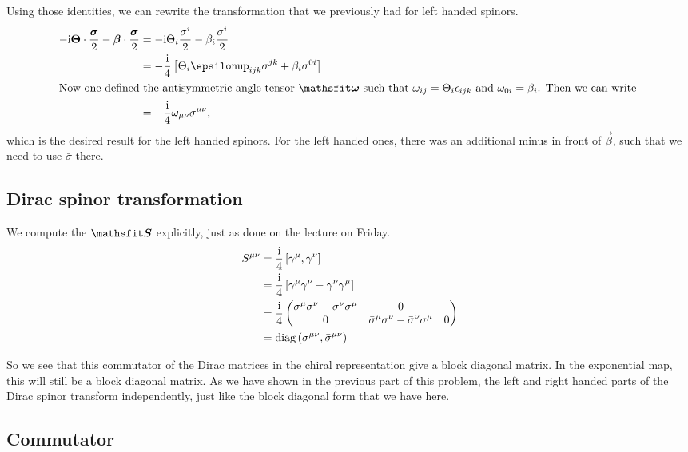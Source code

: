 \documentclass[11pt, english, fleqn, DIV=15, headinclude, BCOR=1cm]{scrartcl}
\begin{document}
Using those identities, we can rewrite the transformation that we previously
had for left handed spinors.
\begin{align*}
    -\iup \vec\Theta \cdot \frac{\vec \sigma}{2} - \vec\beta \cdot \frac{\vec \sigma}{2}
    &= - \iup \Theta_i \frac{\sigma^i}{2} - \beta_i \frac{\sigma^i}{2} \\
    &= - \frac\iup4 \sbr{\Theta_i \epsilonup_{ijk} \sigma^{jk} + \beta_i
    \sigma^{0i}} \\
    \intertext{%
        Now one defined the antisymmetric angle tensor $\tens\omega$ such that
        $\omega_{ij} = \Theta_i \epsilon_{ijk}$ and $\omega_{0i} = \beta_i$.
        Then we can write
    }
    &= - \frac\iup4 \omega_{\mu\nu} \sigma^{\mu\nu},
\end{align*}
which is the desired result for the left handed spinors. For the left handed
ones, there was an additional minus in front of $\vec\beta$, such that we need
to use $\bar\sigma$ there.

\subsection{Dirac spinor transformation}

We compute the $\tens S$ explicitly, just as done on the lecture on Friday.
\begin{align*}
    S^{\mu\nu}
    &= \frac{\mathrm i}4 \left[ \gamma^\mu, \gamma^\nu \right] \\
    &= \frac{\mathrm i}4 \left[ \gamma^\mu \gamma^\nu - \gamma^\nu \gamma^\mu \right] \\
    &= \frac{\mathrm i}4 \begin{pmatrix}
    \sigma^\mu \bar\sigma^\nu - \sigma^\nu \bar\sigma^\mu & 0 \\
    0 & \bar\sigma^\mu \sigma^\nu - \bar\sigma^\nu \sigma^\mu & 0
    \end{pmatrix} \\
    &= \operatorname{diag}\left( \sigma^{\mu\nu}, \bar\sigma^{\mu\nu} \right)
\end{align*}

So we see that this commutator of the Dirac matrices in the chiral
representation give a block diagonal matrix. In the exponential map, this will
still be a block diagonal matrix. As we have shown in the previous part of this
problem, the left and right handed parts of the Dirac spinor transform
independently, just like the block diagonal form that we have here.

\subsection{Commutator}
\end{document}
